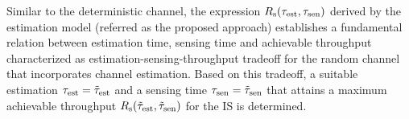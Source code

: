\begin{remark} \label{rem:rem2}
\normalfont
Similar to the deterministic channel, the expression $R_{\text{s}}(\tau_{\text{est}}, \tau_{\text{sen}})$ derived by the estimation model (referred as the proposed approach) establishes a fundamental relation between estimation time, sensing time and achievable throughput  characterized as estimation-sensing-throughput tradeoff for the random channel that incorporates channel estimation. Based on this tradeoff, a suitable estimation $\tau_{\text{est}} = \tilde{\tau}_{\text{est}}$ and a sensing time $\tau_{\text{sen}} = \tilde{\tau}_{\text{sen}}$ that attains a maximum achievable throughput $R_{\text{s}}(\tilde{\tau}_{\text{est}},\tilde{\tau}_{\text{sen}})$ for the IS is determined.
\end{remark}


